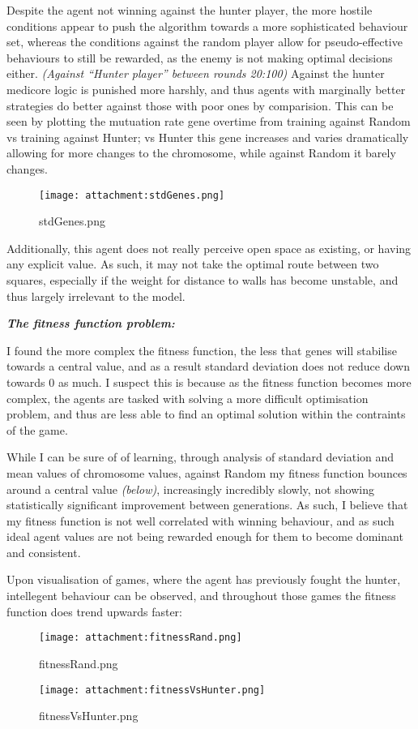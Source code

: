 \documentclass[
]{article}
\begin{document}
Despite the agent not winning against the hunter player, the more
hostile conditions appear to push the algorithm towards a more
sophisticated behaviour set, whereas the conditions against the random
player allow for pseudo-effective behaviours to still be rewarded, as
the enemy is not making optimal decisions either. \emph{(Against
``Hunter player'' between rounds 20:100)} Against the hunter medicore
logic is punished more harshly, and thus agents with marginally better
strategies do better against those with poor ones by comparision. This
can be seen by plotting the mutuation rate gene overtime from training
against Random vs training against Hunter; vs Hunter this gene increases
and varies dramatically allowing for more changes to the chromosome,
while against Random it barely changes.

\begin{figure}
\centering
\texttt{[image: attachment:stdGenes.png]}
\caption{stdGenes.png}
\end{figure}

Additionally, this agent does not really perceive open space as
existing, or having any explicit value. As such, it may not take the
optimal route between two squares, especially if the weight for distance
to walls has become unstable, and thus largely irrelevant to the model.

\textbf{\emph{The fitness function problem:}}

I found the more complex the fitness function, the less that genes will
stabilise towards a central value, and as a result standard deviation
does not reduce down towards 0 as much. I suspect this is because as the
fitness function becomes more complex, the agents are tasked with
solving a more difficult optimisation problem, and thus are less able to
find an optimal solution within the contraints of the game.

While I can be sure of of learning, through analysis of standard
deviation and mean values of chromosome values, against Random my
fitness function bounces around a central value \emph{(below)},
increasingly incredibly slowly, not showing statistically significant
improvement between generations. As such, I believe that my fitness
function is not well correlated with winning behaviour, and as such
ideal agent values are not being rewarded enough for them to become
dominant and consistent.

Upon visualisation of games, where the agent has previously fought the
hunter, intellegent behaviour can be observed, and throughout those
games the fitness function does trend upwards faster:

\begin{figure}
\centering
\texttt{[image: attachment:fitnessRand.png]}
\caption{fitnessRand.png}
\end{figure}

\begin{figure}
\centering
\texttt{[image: attachment:fitnessVsHunter.png]}
\caption{fitnessVsHunter.png}
\end{figure}
\end{document}
